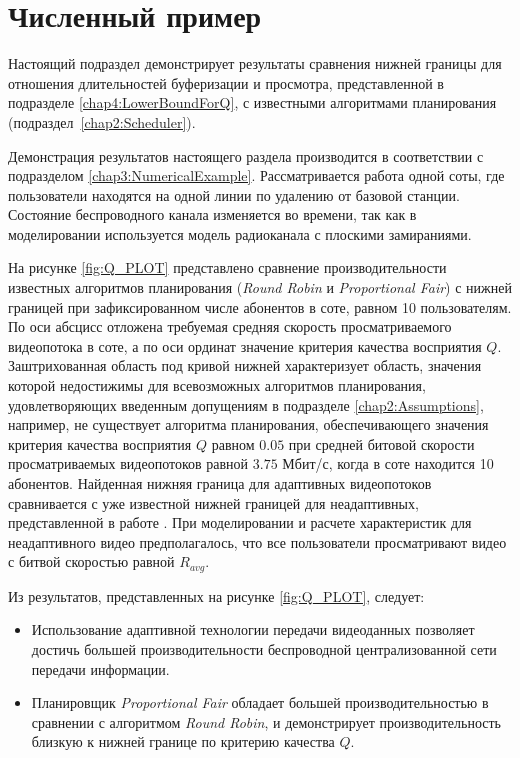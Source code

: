 \section{Численный пример}
\label{chap4:NumericalExample}

Настоящий подраздел демонстрирует результаты сравнения нижней границы для отношения длительностей буферизации и просмотра, представленной в подразделе \ref{chap4:LowerBoundForQ}, с известными алгоритмами планирования (подраздел~\ref{chap2:Scheduler}).

Демонстрация результатов настоящего раздела производится в соответствии с подразделом \ref{chap3:NumericalExample}. Рассматривается работа одной соты, где пользователи находятся на одной линии по удалению от базовой станции. Состояние беспроводного канала изменяется во времени, так как в моделировании используется модель радиоканала с плоскими замираниями.

На рисунке \ref{fig:Q_PLOT} представлено сравнение производительности известных алгоритмов планирования (\textit{Round Robin} и \textit{Proportional Fair}) с нижней границей при зафиксированном числе абонентов в соте, равном 10 пользователям. По оси абсцисс отложена требуемая средняя скорость просматриваемого видеопотока в соте, а по оси ординат значение критерия качества восприятия $Q$. Заштрихованная область под кривой нижней характеризует область, значения которой недостижимы для всевозможных алгоритмов планирования, удовлетворяющих введенным допущениям в подразделе \ref{chap2:Assumptions}, например, не существует алгоритма планирования, обеспечивающего значения критерия качества восприятия $Q$ равном $0.05$ при средней битовой скорости просматриваемых видеопотоков равной $3.75$ Мбит/с, когда в соте находится 10 абонентов. Найденная нижняя граница для адаптивных видеопотоков сравнивается с уже известной нижней границей для неадаптивных, представленной в работе \cite{Bakin_Globecom}. При моделировании и расчете характеристик для неадаптивного видео предполагалось, что все пользователи просматривают видео с битвой скоростью равной $R_{avg}$.


Из результатов, представленных на рисунке \ref{fig:Q_PLOT}, следует:
\begin{itemize}
	\item Использование адаптивной технологии передачи видеоданных позволяет достичь большей производительности беспроводной централизованной сети передачи информации.
	\item Планировщик \textit{Proportional Fair} обладает большей производительностью в сравнении с алгоритмом \textit{Round Robin}, и демонстрирует производительность близкую к нижней границе по критерию качества $Q$.
\end{itemize}


